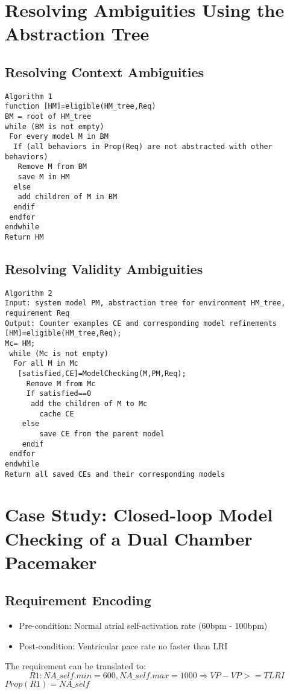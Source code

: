 \section{Resolving Ambiguities Using the Abstraction Tree}
\subsection{Resolving Context Ambiguities}
\begin{Verbatim}
Algorithm 1
function [HM]=eligible(HM_tree,Req)
BM = root of HM_tree
while (BM is not empty)
 For every model M in BM
  If (all behaviors in Prop(Req) are not abstracted with other behaviors)
   Remove M from BM
   save M in HM
  else
   add children of M in BM
  endif
 endfor
endwhile
Return HM
\end{Verbatim}
\subsection{Resolving Validity Ambiguities}

\begin{Verbatim}
Algorithm 2
Input: system model PM, abstraction tree for environment HM_tree, requirement Req
Output: Counter examples CE and corresponding model refinements
[HM]=eligible(HM_tree,Req);
Mc= HM;
 while (Mc is not empty)
  For all M in Mc
   [satisfied,CE]=ModelChecking(M,PM,Req);
	 Remove M from Mc
	 If satisfied==0
	  add the children of M to Mc
		cache CE
	else
		save CE from the parent model
	endif
 endfor
endwhile
Return all saved CEs and their corresponding models
\end{Verbatim}



\section{Case Study: Closed-loop Model Checking of a Dual Chamber Pacemaker}
\label{contextAmbiguities}
\subsection{Requirement Encoding}
\begin{itemize}
	\item Pre-condition: Normal atrial self-activation rate (60bpm - 100bpm)
    \item Post-condition: Ventricular pace rate no faster than LRI
\end{itemize}
The requirement can be translated to:
$$R1: NA\_self.min=600,NA\_self.max=1000\Rightarrow VP-VP>=TLRI$$
$Prop(R1)=NA\_self$
